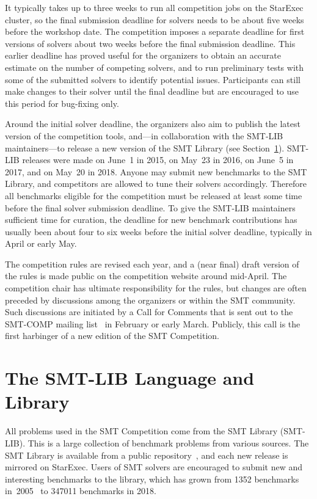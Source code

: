 \documentclass[dvipsnames,table,twoside,11pt]{article}
\begin{document}
It typically takes up to three weeks to run all competition jobs on
the StarExec cluster, so the final submission deadline for solvers
needs to be about five weeks before the workshop date.  The
competition imposes a separate deadline for first versions of solvers
about two weeks before the final submission deadline.  This earlier
deadline has proved useful for the organizers to obtain an accurate
estimate on the number of competing solvers, and to run preliminary
tests with some of the submitted solvers to identify potential issues.
Participants can still make changes to their solver until the final
deadline but are encouraged to use this period for bug-fixing only.

Around the initial solver deadline, the organizers also aim to publish
the latest version of the competition tools, and---in collaboration
with the SMT-LIB maintainers---to release a new version of the SMT
Library (see Section~\ref{sec:smtlib}).  SMT-LIB releases were made on
June~1 in 2015, on May~23 in 2016, on June~5 in 2017, and on May~20 in
2018.  Anyone may submit new benchmarks to the SMT Library, and
competitors are allowed to tune their solvers accordingly.
Therefore all benchmarks eligible for the competition must be released
at least some time before the final solver submission deadline.  To
give the SMT-LIB maintainers sufficient time for curation, the
deadline for new benchmark contributions has usually been about four
to six weeks before the initial solver deadline, typically in April or
early May.

The competition rules are revised each year, and a (near final) draft
version of the rules is made public on the competition website around
mid-April.  The competition chair has ultimate responsibility for the
rules, but changes are often preceded by discussions among the
organizers or within the SMT community.  Such discussions are
initiated by a Call for Comments that is sent out to the SMT-COMP
mailing list~\cite{smtcomp-mailinglist} in February or early March.
Publicly, this call is the first harbinger of a new edition of the SMT
Competition.


\section{The SMT-LIB Language and Library}
\label{sec:smtlib}

All problems used in the SMT Competition come from the SMT Library
(SMT-LIB).  This is a large collection of benchmark problems from
various sources.  The SMT Library is available from a public
repository~\cite{smtlib-repository}, and each new release is mirrored
on StarExec.  Users of SMT solvers are encouraged to submit new and
interesting benchmarks to the library, which has grown from \num{1352}
benchmarks in~2005~\cite{BdMS05} to \num{347011} benchmarks in 2018.
\end{document}
